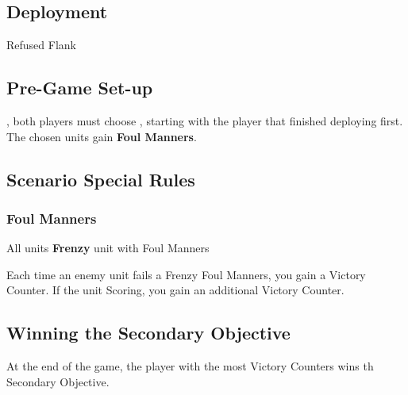 
\label{FoulManners}


\subsection*{Deployment}

 Refused Flank


\subsection*{Pre-Game Set-up}

, both players must choose , starting with the player that finished deploying first. The chosen units gain \textbf{Foul Manners}.

\subsection*{Scenario Special Rules}

\subsubsection*{Foul Manners}

All units  \textbf{Frenzy}  unit with Foul Manners 

Each time an enemy unit fails a Frenzy   Foul Manners, you gain a Victory Counter. If the  unit  Scoring, you gain an additional Victory Counter. 

\subsection*{Winning the Secondary Objective}

At the end of the game, the player with the most Victory Counters wins th Secondary Objective.
